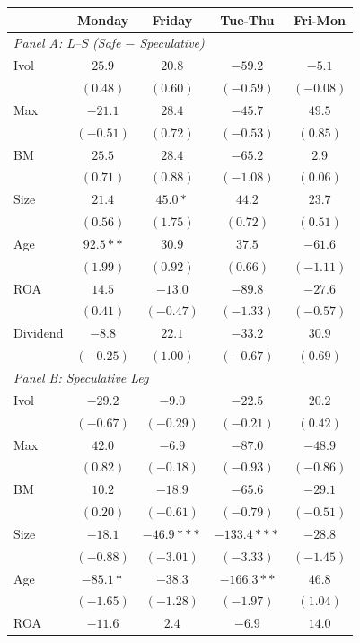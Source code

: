 \centering
\footnotesize
\begin{tabular}{l c c c c}
\toprule
 & Monday & Friday & Tue-Thu & Fri-Mon \\
\midrule
\multicolumn{5}{l}{\textit{Panel A: L--S (Safe $-$ Speculative)}} \\
Ivol & $25.9$ & $20.8$ & $-59.2$ & $-5.1$ \\
 & $(0.48)$ & $(0.60)$ & $(-0.59)$ & $(-0.08)$ \\
Max & $-21.1$ & $28.4$ & $-45.7$ & $49.5$ \\
 & $(-0.51)$ & $(0.72)$ & $(-0.53)$ & $(0.85)$ \\
BM & $25.5$ & $28.4$ & $-65.2$ & $2.9$ \\
 & $(0.71)$ & $(0.88)$ & $(-1.08)$ & $(0.06)$ \\
Size & $21.4$ & $45.0*$ & $44.2$ & $23.7$ \\
 & $(0.56)$ & $(1.75)$ & $(0.72)$ & $(0.51)$ \\
Age & $92.5**$ & $30.9$ & $37.5$ & $-61.6$ \\
 & $(1.99)$ & $(0.92)$ & $(0.66)$ & $(-1.11)$ \\
ROA & $14.5$ & $-13.0$ & $-89.8$ & $-27.6$ \\
 & $(0.41)$ & $(-0.47)$ & $(-1.33)$ & $(-0.57)$ \\
Dividend & $-8.8$ & $22.1$ & $-33.2$ & $30.9$ \\
 & $(-0.25)$ & $(1.00)$ & $(-0.67)$ & $(0.69)$ \\
\midrule
\multicolumn{5}{l}{\textit{Panel B: Speculative Leg}} \\
Ivol & $-29.2$ & $-9.0$ & $-22.5$ & $20.2$ \\
 & $(-0.67)$ & $(-0.29)$ & $(-0.21)$ & $(0.42)$ \\
Max & $42.0$ & $-6.9$ & $-87.0$ & $-48.9$ \\
 & $(0.82)$ & $(-0.18)$ & $(-0.93)$ & $(-0.86)$ \\
BM & $10.2$ & $-18.9$ & $-65.6$ & $-29.1$ \\
 & $(0.20)$ & $(-0.61)$ & $(-0.79)$ & $(-0.51)$ \\
Size & $-18.1$ & $-46.9***$ & $-133.4***$ & $-28.8$ \\
 & $(-0.88)$ & $(-3.01)$ & $(-3.33)$ & $(-1.45)$ \\
Age & $-85.1*$ & $-38.3$ & $-166.3**$ & $46.8$ \\
 & $(-1.65)$ & $(-1.28)$ & $(-1.97)$ & $(1.04)$ \\
ROA & $-11.6$ & $2.4$ & $-6.9$ & $14.0$ \\

\end{tabular}
